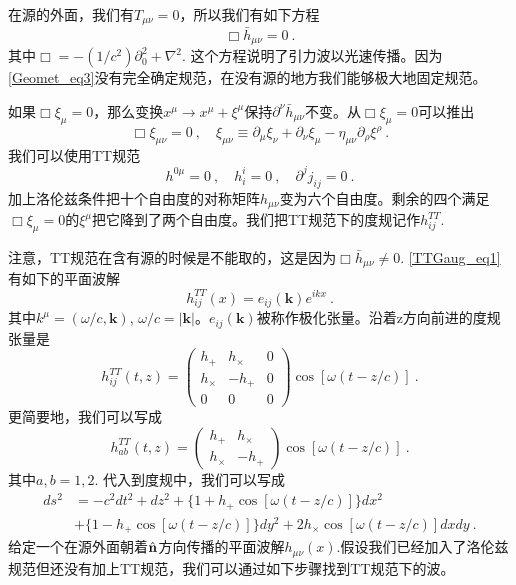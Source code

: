 在源的外面，我们有$T_{\mu\nu} = 0$，所以我们有如下方程
\begin{equation}\label{TTGaug_eq1}
\Box \bar h_{\mu\nu} = 0 ~.
\end{equation}
其中$\Box = - (1/c^2) \partial_0^2 +\nabla^2$. 这个方程说明了引力波以光速传播。因为\autoref{Geomet_eq3}没有完全确定规范，在没有源的地方我们能够极大地固定规范。

如果$\Box \xi_\mu = 0$，那么变换$x^\mu \rightarrow x^\mu+\xi^\mu$保持$\partial^\nu \bar h_{\mu\nu}$不变。从$\Box \xi_\mu = 0$可以推出
\begin{equation}
\Box \xi_{\mu\nu} = 0~, \quad \xi_{\mu\nu} \equiv \partial_{\mu} \xi_\nu +\partial_\nu \xi_\mu - \eta_{\mu\nu} \partial_\rho\xi^\rho~. 
\end{equation}
我们可以使用TT规范
\begin{equation}
h^{0\mu} = 0~, \quad h^i_i = 0~, \quad \partial^j j_{ij} = 0~.
\end{equation}
加上洛伦兹条件把十个自由度的对称矩阵$h_{\mu\nu}$变为六个自由度。剩余的四个满足$\Box \xi_\mu = 0$的$\xi^\mu$把它降到了两个自由度。我们把TT规范下的度规记作$h_{ij}^{TT}$. 

注意，TT规范在含有源的时候是不能取的，这是因为$\Box \bar h_{\mu\nu} \neq 0$. \autoref{TTGaug_eq1}有如下的平面波解
\begin{equation}
h_{ij}^{TT} (x) = e_{ij} (\mathbf k) e^{ikx} ~.  
\end{equation}
其中$k^\mu = (\omega/c,\mathbf k)$, $\omega/c = |\mathbf k|$。$e_{ij}(\mathbf k)$被称作极化张量。沿着z方向前进的度规张量是
\begin{equation}
h_{ij}^{TT} (t,z) = 
\begin{pmatrix}
h_+ & h_\times & 0 \\
h_\times & - h_+ & 0 \\
0 & 0 & 0
\end{pmatrix} \cos [\omega (t - z/c)]~. 
\end{equation}
更简要地，我们可以写成
\begin{equation}
h_{ab}^{TT} (t,z) = 
\begin{pmatrix}
h_+ & h_\times   \\
h_\times & - h_+   
\end{pmatrix} \cos [\omega (t - z/c)]~. 
\end{equation}
其中$a,b = 1,2$. 代入到度规中，我们可以写成
\begin{equation}
\begin{aligned}
ds^2 & = - c^2 dt^2 + dz^2 + \{ 1+ h_+ \cos [\omega(t-z/c)] \} dx^2 \\
& + \{ 1-h_+ \cos [\omega(t-z/c)] \} dy^2 + 2 h_\times \cos[\omega(t-z/c)] dx dy~.
\end{aligned}
\end{equation}
给定一个在源外面朝着$\hat{\bf{n}}$方向传播的平面波解$h_{\mu\nu}(x)$.假设我们已经加入了洛伦兹规范但还没有加上TT规范，我们可以通过如下步骤找到TT规范下的波。

